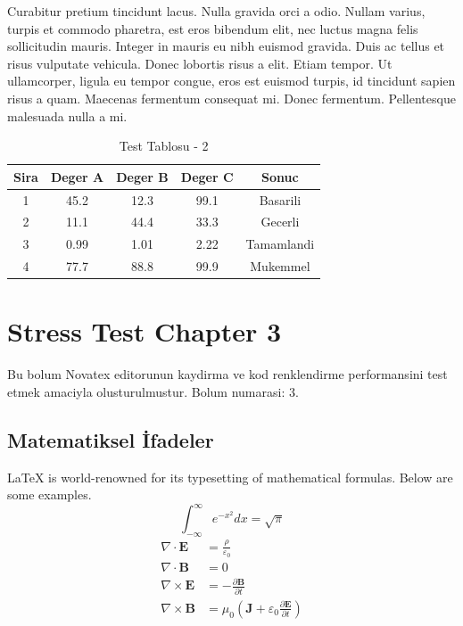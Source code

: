 \documentclass[12pt,a4paper]{article}
\begin{document}
Curabitur pretium tincidunt lacus. Nulla gravida orci a odio. Nullam varius, turpis et commodo pharetra, est eros bibendum elit, nec luctus magna felis sollicitudin mauris. Integer in mauris eu nibh euismod gravida. Duis ac tellus et risus vulputate vehicula. Donec lobortis risus a elit. Etiam tempor. Ut ullamcorper, ligula eu tempor congue, eros est euismod turpis, id tincidunt sapien risus a quam. Maecenas fermentum consequat mi. Donec fermentum. Pellentesque malesuada nulla a mi.

\begin{table}[h!]
\centering
\begin{tabular}{|c|c|c|c|c|}
\hline
\textbf{Sira} & \textbf{Deger A} & \textbf{Deger B} & \textbf{Deger C} & \textbf{Sonuc} \\
\hline
1 & 45.2 & 12.3 & 99.1 & Basarili \\
2 & 11.1 & 44.4 & 33.3 & Gecerli \\
3 & 0.99 & 1.01 & 2.22 & Tamamlandi \\
4 & 77.7 & 88.8 & 99.9 & Mukemmel \\
\hline
\end{tabular}
\caption{Test Tablosu - 2}
\end{table}

\newpage
\section{Stress Test Chapter 3}
Bu bolum Novatex editorunun kaydirma ve kod renklendirme performansini test etmek amaciyla olusturulmustur. Bolum numarasi: 3.

\subsection{Matematiksel İfadeler}
\LaTeX{} is world-renowned for its typesetting of mathematical formulas. Below are some examples.
\begin{equation}
\int_{-\infty}^{\infty} e^{-x^2} dx = \sqrt{\pi}
\end{equation}
\begin{align}
\nabla \cdot \mathbf{E} &= \frac{\rho}{\varepsilon_0} \\
\nabla \cdot \mathbf{B} &= 0 \\
\nabla \times \mathbf{E} &= -\frac{\partial \mathbf{B}}{\partial t} \\
\nabla \times \mathbf{B} &= \mu_0\left(\mathbf{J} + \varepsilon_0 \frac{\partial \mathbf{E}}{\partial t}\right)
\end{align}
\end{document}
